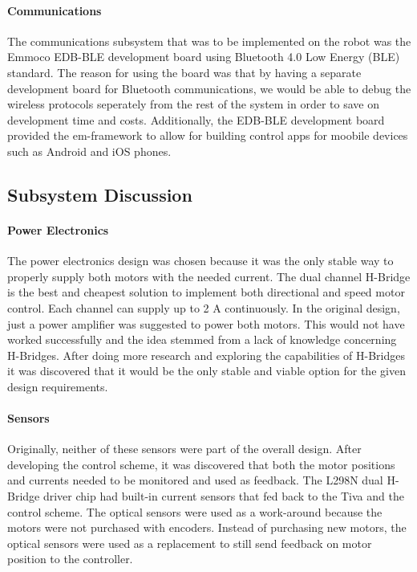 \documentclass[11pt]{report}
\begin{document}
\begin{spacing}{1.5}
        \paragraph{Communications}
        
        The communications subsystem that was to be implemented on the robot was the Emmoco EDB-BLE development board using Bluetooth 4.0 Low Energy (BLE) standard. The reason for using the board was that by having a separate development board for Bluetooth communications, we would be able to debug the wireless protocols seperately from the rest of the system in order to save on development time and costs. Additionally, the EDB-BLE development board provided the em-framework to allow for building control apps for moobile devices such as Android and iOS phones.
        

    \subsection*{Subsystem Discussion}
    
        \paragraph{Power Electronics}
        
        The power electronics design was chosen because it was the only stable way to properly supply both motors with the needed current. The dual channel H-Bridge is the best and cheapest solution to implement both directional and speed motor control. Each channel can supply up to 2 A continuously. In the original design, just a power amplifier was suggested to power both motors. This would not have worked successfully and the idea stemmed from a lack of knowledge concerning H-Bridges. After doing more research and exploring the capabilities of H-Bridges it was discovered that it would be the only stable and viable option for the given design requirements.
        
        \paragraph{Sensors}
        
        Originally, neither of these sensors were part of the overall design. After developing the control scheme, it was discovered that both the motor positions and currents needed to be monitored and used as feedback. The L298N dual H-Bridge driver chip had built-in current sensors that fed back to the Tiva and the control scheme. The optical sensors were used as a work-around because the motors were not purchased with encoders. Instead of purchasing new motors, the optical sensors were used as a replacement to still send feedback on motor position to the controller.
        

\end{spacing}
\end{document}
